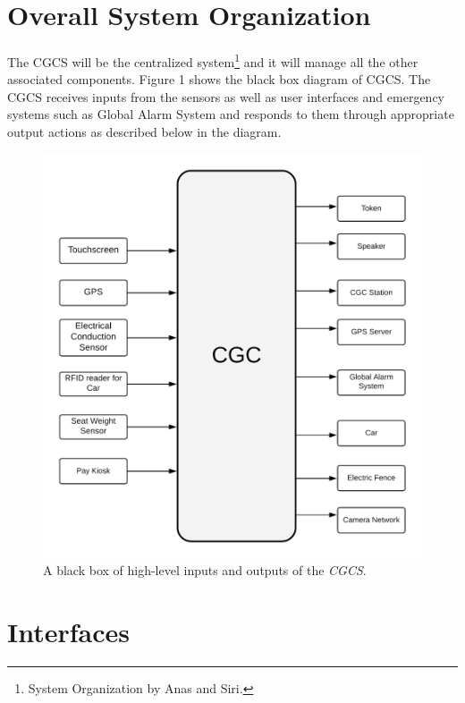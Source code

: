 \documentclass[12pt]{article}
\begin{document}
\section{Overall System Organization} 
\label{sys}
\paragraph{} The CGCS will be the centralized system\footnote{System Organization by Anas and Siri.} and it will manage all the other associated components. Figure 1 shows the black box diagram of CGCS. The CGCS receives inputs from the sensors as well as user interfaces and emergency systems such as Global Alarm System and responds to them through appropriate output actions as described below in the diagram. 

    \begin{figure}[H]
  		\centerline{\includegraphics[scale=.20]{CGCBlackBox.png}}
  		\caption{A black box of high-level inputs and outputs of the \textit{CGCS}.}
  		\label{fig:blackbox}
	\end{figure}


\vfill
\pagebreak



\section{Interfaces} %
\label{int}
\end{document}
